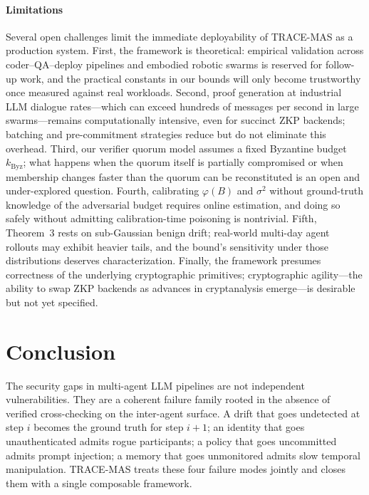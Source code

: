 \documentclass[conference]{IEEEtran}
\begin{document}
\paragraph*{Limitations}
Several open challenges limit the immediate deployability of
\textsc{TRACE-MAS} as a production system. First, the framework
is theoretical: empirical validation across coder--QA--deploy
pipelines and embodied robotic swarms is reserved for follow-up
work, and the practical constants in our bounds will only become
trustworthy once measured against real workloads. Second, proof
generation at industrial LLM dialogue rates---which can exceed
hundreds of messages per second in large swarms---remains
computationally intensive, even for succinct ZKP
backends; batching and pre-commitment strategies reduce but do not
eliminate this overhead. Third, our verifier quorum model assumes
a fixed Byzantine budget $k_{\mathrm{Byz}}$; what happens when
the quorum itself is partially compromised or when membership
changes faster than the quorum can be reconstituted is an open
and under-explored question. Fourth, calibrating $\varphi(B)$
and $\sigma^2$ without ground-truth knowledge of the adversarial
budget requires online estimation, and doing so safely without
admitting calibration-time poisoning is nontrivial. Fifth,
Theorem~3 rests on sub-Gaussian benign drift; real-world
multi-day agent rollouts may exhibit heavier tails, and the bound's
sensitivity under those distributions deserves characterization.
Finally, the framework presumes correctness of the underlying
cryptographic primitives; cryptographic agility---the ability to
swap ZKP backends as advances in cryptanalysis emerge---is
desirable but not yet specified.

\section{Conclusion}
\label{sec:conclusion}

The security gaps in multi-agent LLM pipelines are not independent
vulnerabilities. They are a coherent failure family rooted in the
absence of verified cross-checking on the inter-agent surface. A
drift that goes undetected at step $i$ becomes the ground truth
for step $i+1$; an identity that goes unauthenticated admits rogue
participants; a policy that goes uncommitted admits prompt injection;
a memory that goes unmonitored admits slow temporal manipulation.
\textsc{TRACE-MAS} treats these four failure modes jointly and closes
them with a single composable framework.
\end{document}
